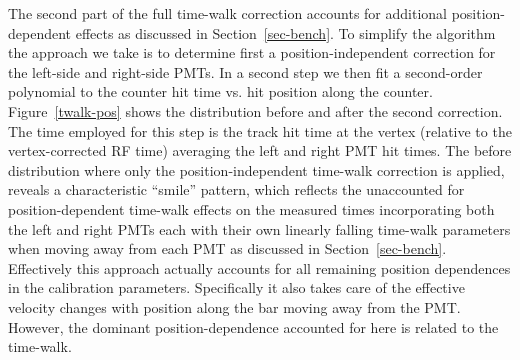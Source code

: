 \documentclass{elsart}
\begin{document}
The second part of the full time-walk correction accounts for additional position-dependent effects as
discussed in Section~\ref{sec-bench}. To simplify the algorithm the approach we take is to determine
first a position-independent correction for the left-side and right-side PMTs. In a second step we then
fit a second-order polynomial to the counter hit time vs. hit position along the counter.
Figure~\ref{twalk-pos} shows the distribution before and after the second correction. The time employed
for this step is the track hit time at the vertex (relative to the vertex-corrected RF time) averaging the
left and right PMT hit times. The before distribution where only the position-independent time-walk
correction is applied, reveals a characteristic ``smile'' pattern, which reflects the unaccounted for
position-dependent time-walk effects on the measured times incorporating both the left and right PMTs
each with their own linearly falling time-walk parameters when moving away from each PMT as discussed in
Section~\ref{sec-bench}. Effectively this approach actually accounts for all remaining position dependences
in the calibration parameters. Specifically it also takes care of the effective velocity changes with position
along the bar moving away from the PMT. However, the dominant position-dependence accounted for here is
related to the time-walk.
\end{document}
